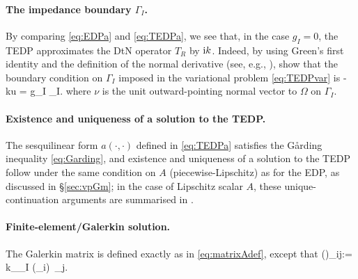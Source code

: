%    
%

\paragraph{The impedance boundary $\Gamma_I$.} By comparing \eqref{eq:EDPa} and \eqref{eq:TEDPa}, we see that, in the case $g_I=0$, the TEDP approximates the DtN operator $T_R$ by $\mathrm{i} k$. Indeed, by using Green's first identity and the definition of the normal derivative (see, e.g., \cite[Lemma 4.3]{Mc:00}), show that the boundary condition on $\Gamma_I$ imposed in the variational problem \eqref{eq:TEDPvar} is 
\beq\label{eq:imp}
\dudnu - \ri k\gamma u = g_I \ton \Gamma_I.
\eeq
where $\nu$ is the unit outward-pointing normal vector to $\Omega$ on $\Gamma_I$.

\paragraph{Existence and uniqueness of a solution to the TEDP.} The sesquilinear form $a(\cdot,\cdot)$ defined in \eqref{eq:TEDPa} satisfies the G\aa rding inequality \eqref{eq:Garding}, and existence and uniqueness of a solution to the TEDP follow under the same condition on $A$ (piecewise-Lipschitz) as for the EDP, as discussed in \S\ref{sec:vpGm}; in the case of Lipschitz scalar $A$, these unique-continuation arguments are summarised in \cite[\S2]{GrSa:18}.

\paragraph{Finite-element/Galerkin solution.}
The Galerkin matrix is defined exactly as in \eqref{eq:matrixAdef}, except that 
\beq\label{eq:NTEDP}
\big(\Nmat\big)_{ij}:= \ri k\int_{\Gamma_I}  (\gamma\phi_i) \,\gamma \phi_j.
\eeq


